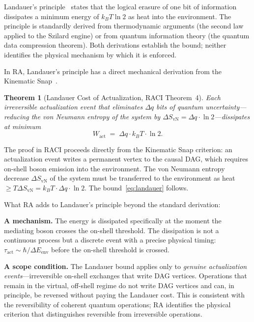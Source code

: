 \documentclass[11pt,a4paper]{article}
\theoremstyle{plain}
\newtheorem{theorem}{Theorem}[section]
\theoremstyle{definition}
\theoremstyle{remark}
\begin{document}
Landauer's principle~\citep{Landauer1961} states that the logical erasure of one
bit of information dissipates a minimum energy of $k_B T \ln 2$ as heat into the
environment. The principle is standardly derived from thermodynamic arguments
(the second law applied to the Szilard engine) or from quantum information theory
(the quantum data compression theorem). Both derivations establish the bound; 
neither identifies the physical mechanism by which it is enforced.

In RA, Landauer's principle has a direct mechanical derivation from the Kinematic
Snap~\citep{Sandeman2026RACI}.

\begin{theorem}[Landauer Cost of Actualization, RACI Theorem~4]
Each irreversible actualization event that eliminates $\Delta q$ bits of quantum
uncertainty---reducing the von Neumann entropy of the system by
$\Delta S_{\mathrm{vN}} = \Delta q \cdot \ln 2$---dissipates at minimum
\begin{equation}
  W_{\mathrm{act}} \;=\; \Delta q \cdot k_B T \cdot \ln 2.
  \label{eq:landauer}
\end{equation}
\end{theorem}

The proof in RACI proceeds directly from the Kinematic Snap criterion: an
actualization event writes a permanent vertex to the causal DAG, which requires
on-shell boson emission into the environment. The von Neumann entropy decrease
$\Delta S_{\mathrm{vN}}$ of the system must be transferred to the environment as
heat $\geq T \Delta S_{\mathrm{vN}} = k_B T \cdot \Delta q \cdot \ln 2$. The
bound~\eqref{eq:landauer} follows.

What RA adds to Landauer's principle beyond the standard derivation:

\textbf{A mechanism.} The energy is dissipated specifically at the moment the
mediating boson crosses the on-shell threshold. The dissipation is not a
continuous process but a discrete event with a precise physical timing:
$\tau_{\mathrm{act}} \sim \hbar / \Delta E_{\mathrm{env}}$ before the on-shell
threshold is crossed.

\textbf{A scope condition.} The Landauer bound applies only to \emph{genuine
actualization events}---irreversible on-shell exchanges that write DAG vertices.
Operations that remain in the virtual, off-shell regime do not write DAG vertices
and can, in principle, be reversed without paying the Landauer cost. This is
consistent with the reversibility of coherent quantum operations; RA identifies the
physical criterion that distinguishes reversible from irreversible operations.
\end{document}
